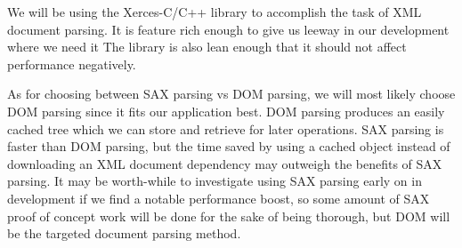We will be using the Xerces-C/C++ library to accomplish the task of XML document parsing.
It is feature rich enough to give us leeway in our development where we need it
The library is also lean enough that it should not affect performance negatively.

As for choosing between SAX parsing vs DOM parsing, we will most likely choose DOM parsing since it fits our application best.
DOM parsing produces an easily cached tree which we can store and retrieve for later operations.
SAX parsing is faster than DOM parsing, but the time saved by using a cached object instead of downloading an XML document dependency may outweigh the benefits of SAX parsing.
It may be worth-while to investigate using SAX parsing early on in development if we find a notable performance boost, so some amount of SAX proof of concept work will be done for the sake of being thorough, but DOM will be the targeted document parsing method.
